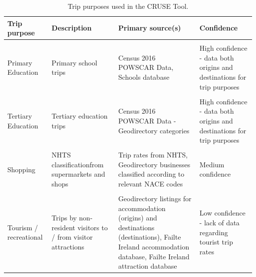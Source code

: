 \documentclass[
  super,
  preprint,
  3p]{elsarticle}
\begin{document}
\begin{longtable}[t]{>{\raggedright\arraybackslash}p{5em}>{\raggedright\arraybackslash}p{12em}>{\raggedright\arraybackslash}p{15em}>{\raggedright\arraybackslash}p{15em}}

\caption{\label{tbl-trip-purposes}Trip purposes used in the CRUSE Tool.}

\tabularnewline

\toprule
Trip purpose & Description & Primary source(s) & Confidence\\
\midrule
\cellcolor{gray!10}{Work (commute)} & \cellcolor{gray!10}{Commuting to / from workplaces} & \cellcolor{gray!10}{Census 2016 POWSCAR Data} & \cellcolor{gray!10}{High confidence - data both origins and destinations for trip purposes}\\
Primary Education & Primary school trips & Census 2016 POWSCAR Data, Schools database & High confidence - data both origins and destinations for trip purposes\\
\cellcolor{gray!10}{Secondary Education} & \cellcolor{gray!10}{Secondary school trips} & \cellcolor{gray!10}{Census 2016 POWSCAR Data, Schools database} & \cellcolor{gray!10}{High confidence - data both origins and destinations for trip purposes}\\
Tertiary Education & Tertiary education trips & Census 2016 POWSCAR Data - Geodirectory categories & High confidence - data both origins and destinations for trip purposes\\
\cellcolor{gray!10}{Social} & \cellcolor{gray!10}{NHTS classification (e.g. restaurants, cinemas, gyms etc.)} & \cellcolor{gray!10}{Trip rates from NHTS, Geodirectory businesses classified according to relevant NACE codes} & \cellcolor{gray!10}{Medium confidence}\\
\addlinespace
Shopping & NHTS classificationfrom supermarkets and shops & Trip rates from NHTS, Geodirectory businesses classified according to relevant NACE codes & Medium confidence\\
\cellcolor{gray!10}{Personal / other} & \cellcolor{gray!10}{Combination of two NHTS classifications, and includes trips to medical, personal services and others} & \cellcolor{gray!10}{Trip rates from NHTS, Geodirectory businesses classified according to relevant NACE codes} & \cellcolor{gray!10}{Medium confidence}\\
Tourism / recreational & Trips by non-resident visitors to / from visitor attractions & Geodirectory listings for accommodation (origins) and destinations (destinations), Failte Ireland accommodation database, Failte Ireland attraction database & Low confidence - lack of data regarding tourist trip rates\\
\bottomrule

\end{longtable}
\end{document}
